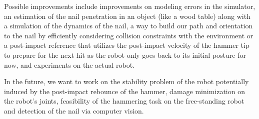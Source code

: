 \documentclass[conference]{IEEEtran}
\begin{document}
Possible improvements include improvements on modeling errors in the simulator, an estimation of the nail penetration in an object (like a wood table) along with a simulation of the dynamics of the nail, a way to build our path and orientation to the nail by efficiently considering collision constraints with the environment or a post-impact reference that utilizes the post-impact velocity of the hammer tip to prepare for the next hit as the robot only goes back to its initial posture for now, and experiments on the actual robot. 

In the future, we want to work on the stability problem of the robot potentially induced by the post-impact rebounce of the hammer, damage minimization on the robot's joints, feasibility of the hammering task on the free-standing robot and detection of the nail via computer vision. 
\label{Conclusion}



\end{document}
